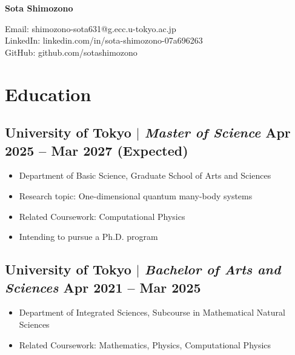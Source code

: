 \documentclass[11pt]{article} %
\begin{document}
\begin{center}
	\begin{minipage}{0.5\textwidth}
		{\Huge\bfseries
			Sota Shimozono %
		} \\ \medskip
	\end{minipage} \hfill
	\begin{minipage}{0.4\textwidth}
		\raggedleft
		Email: shimozono-sota631@g.ecc.u-tokyo.ac.jp \\
		LinkedIn: linkedin.com/in/sota-shimozono-07a696263 \\
		GitHub: github.com/sotashimozono
	\end{minipage}
\end{center}

\section{Education}
\subsection{University of Tokyo $|$ {\normalfont\itshape Master of Science} \hfill Apr 2025 -- Mar 2027 (Expected)}
\begin{itemize}
	\item Department of Basic Science, Graduate School of Arts and Sciences
	\item Research topic: One-dimensional quantum many-body systems
	\item Related Coursework: Computational Physics
	\item Intending to pursue a Ph.D. program
\end{itemize}
\subsection{University of Tokyo $|$ {\normalfont\itshape Bachelor of Arts and Sciences} \hfill Apr 2021 -- Mar 2025}
\begin{itemize}
	\item Department of Integrated Sciences, Subcourse in Mathematical Natural Sciences
	\item Related Coursework: Mathematics, Physics, Computational Physics
\end{itemize}
\end{document}
